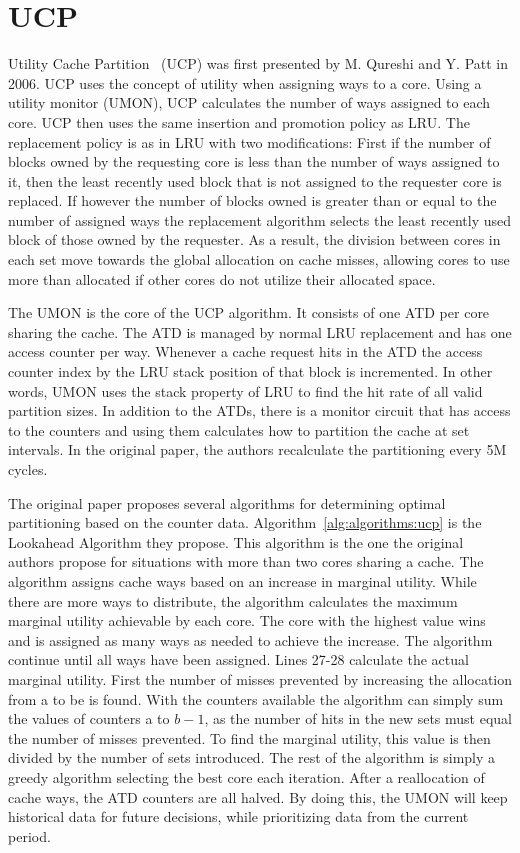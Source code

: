 \section{UCP}
\label{sec:algorithms:ucp}

Utility Cache Partition~\cite{Qureshi2006} (UCP) was first presented by M. Qureshi and Y. Patt in 2006. 
UCP uses the concept of utility when assigning ways to a core.
Using a utility monitor (UMON), UCP calculates the number of ways assigned to each core.
UCP then uses the same insertion and promotion policy as LRU.
The replacement policy is as in LRU with two modifications:
First if the number of blocks owned by the requesting core is less than the number of ways assigned to it, then the least recently used block that is not assigned to the requester core is replaced.
If however the number of blocks owned is greater than or equal to the number of assigned ways the replacement algorithm selects the  least recently used block of those owned by the requester.
As a result, the division between cores in each set move towards the global allocation on cache misses, allowing cores to use more than allocated if other cores do not utilize their allocated space.

The UMON is the core of the UCP algorithm.
It consists of one ATD per core sharing the cache. 
The ATD is managed by normal LRU replacement and has one access counter per way.
Whenever a cache request hits in the ATD the access counter index by the LRU stack position of that block is incremented.
In other words, UMON uses the stack property of LRU to find the hit rate of all valid partition sizes.
In addition to the ATDs, there is a monitor circuit that has access to the counters and using them calculates how to partition the cache at set intervals. 
In the original paper, the authors recalculate the partitioning every 5M cycles.

The original paper proposes several algorithms for determining optimal partitioning based on the counter data. 
Algorithm~\ref{alg:algorithms:ucp} is the Lookahead Algorithm they propose.
This algorithm is the one the original authors propose for situations with more than two cores sharing a cache.
The algorithm assigns cache ways based on an increase in marginal utility.
While there are more ways to distribute, the algorithm calculates the maximum marginal utility achievable by each core. 
The core with the highest value wins and is assigned as many ways as needed to achieve the increase.
The algorithm continue until all ways have been assigned.
Lines 27-28 calculate the actual marginal utility. 
First the number of misses prevented by increasing the allocation from a to be is found.
With the counters available the algorithm can simply sum the values of counters a to $b-1$, as the number of hits in the new sets must equal the number of misses prevented.
To find the marginal utility, this value is then divided by the number of sets introduced.
The rest of the algorithm is simply a greedy algorithm selecting the best core each iteration.
After a reallocation of cache ways, the ATD counters are all halved.
By doing this, the UMON will keep historical data for future decisions, while prioritizing data from the current period.

